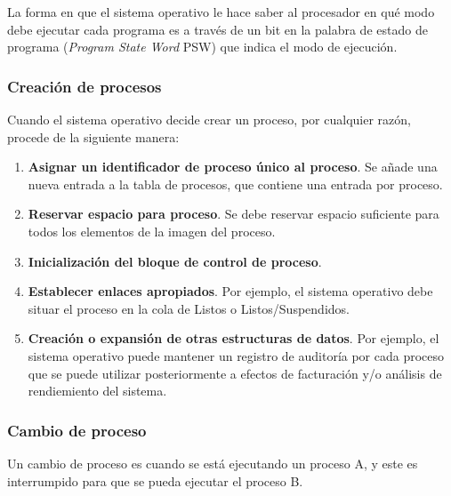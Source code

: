 \documentclass[12pt]{article}
\begin{document}
  La forma en que el sistema operativo le hace saber al procesador en qué modo debe ejecutar cada programa es a través de un bit en la palabra de estado de programa (\textit{Program State Word} PSW) que indica el modo de ejecución.

  \subsubsection{Creación de procesos}
  Cuando el sistema operativo decide crear un proceso, por cualquier razón, procede de la siguiente manera:
  \begin{enumerate}[1.]
    \item \textbf{Asignar un identificador de proceso único al proceso}. Se añade una nueva entrada a la tabla de procesos, que contiene una entrada por proceso.

    \item \textbf{Reservar espacio para proceso}. Se debe reservar espacio suficiente para todos los elementos de la imagen del proceso.

    \item \textbf{Inicialización del bloque de control de proceso}. 

    \item \textbf{Establecer enlaces apropiados}. Por ejemplo, el sistema operativo debe situar el proceso en la cola de Listos o Listos/Suspendidos.

    \item \textbf{Creación o expansión de otras estructuras de datos}. Por ejemplo, el sistema operativo puede mantener un registro de auditoría por cada proceso que se puede utilizar posteriormente a efectos de facturación y/o análisis de rendiemiento del sistema.
  \end{enumerate}

  \subsubsection{Cambio de proceso}
  Un cambio de proceso es cuando se está ejecutando un proceso A, y este es interrumpido para que se pueda ejecutar el proceso B.
\end{document}
